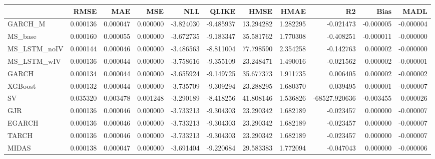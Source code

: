 \begin{tabular}{lrrrrrrrrrr}
\toprule
 & RMSE & MAE & MSE & NLL & QLIKE & HMSE & HMAE & R2 & Bias & MADL \\
\midrule
GARCH_M & 0.000136 & 0.000047 & 0.000000 & -3.824030 & -9.485937 & 13.294282 & 1.282295 & -0.021473 & -0.000005 & -0.000004 \\
MS_base & 0.000160 & 0.000055 & 0.000000 & -3.672735 & -9.183347 & 35.581762 & 1.770308 & -0.408251 & -0.000011 & -0.000000 \\
MS_LSTM_noIV & 0.000144 & 0.000046 & 0.000000 & -3.486563 & -8.811004 & 77.798590 & 2.354258 & -0.142763 & 0.000002 & -0.000000 \\
MS_LSTM_wIV & 0.000136 & 0.000044 & 0.000000 & -3.758616 & -9.355109 & 23.248471 & 1.490016 & -0.021562 & 0.000002 & -0.000001 \\
GARCH & 0.000134 & 0.000044 & 0.000000 & -3.655924 & -9.149725 & 35.677373 & 1.911735 & 0.006405 & 0.000002 & -0.000002 \\
XGBoost & 0.000132 & 0.000044 & 0.000000 & -3.735709 & -9.309294 & 23.288295 & 1.680370 & 0.039495 & 0.000001 & -0.000007 \\
SV & 0.035320 & 0.003478 & 0.001248 & -3.290189 & -8.418256 & 41.808146 & 1.536826 & -68527.920636 & -0.003455 & 0.000026 \\
GJR & 0.000136 & 0.000046 & 0.000000 & -3.733213 & -9.304303 & 23.290342 & 1.682189 & -0.023457 & 0.000000 & -0.000007 \\
EGARCH & 0.000136 & 0.000046 & 0.000000 & -3.733213 & -9.304303 & 23.290342 & 1.682189 & -0.023457 & 0.000000 & -0.000007 \\
TARCH & 0.000136 & 0.000046 & 0.000000 & -3.733213 & -9.304303 & 23.290342 & 1.682189 & -0.023457 & 0.000000 & -0.000007 \\
MIDAS & 0.000138 & 0.000047 & 0.000000 & -3.691404 & -9.220684 & 29.583383 & 1.772094 & -0.047043 & 0.000000 & -0.000006 \\
\bottomrule
\end{tabular}
